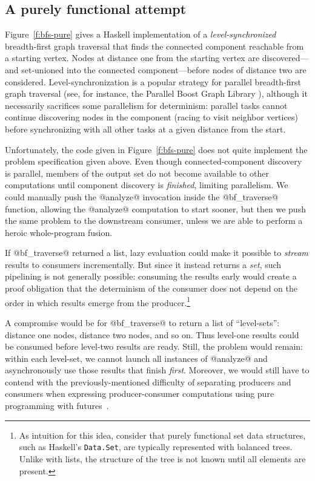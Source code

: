 \subsection{A purely functional attempt}

Figure~\ref{f:bfs-pure} gives a Haskell implementation of a
\emph{level-synchronized} breadth-first graph traversal that finds the
connected component reachable from a starting vertex.  Nodes at
distance one from the starting vertex are discovered---and set-unioned
into the connected component---before nodes of distance two are
considered.  Level-synchronization is a popular strategy for parallel
breadth-first graph traversal (see, for instance, the Parallel Boost
Graph Library \cite{bfs-pbgl}), although it necessarily sacrifices
some parallelism for determinism: parallel tasks cannot continue
discovering nodes in the component (racing to visit neighbor vertices)
before synchronizing with all other tasks at a given distance from the
start.

Unfortunately, the code given in Figure~\ref{f:bfs-pure} does not
quite implement the problem specification given above.  Even though
connected-component discovery is parallel, members of the output set
do not become available to other computations until component
discovery is \emph{finished}, limiting parallelism.  We could manually
push the @analyze@ invocation inside the @bf_traverse@ function,
allowing the @analyze@ computation to start sooner, but then we push
the same problem to the downstream consumer, unless we are able to
perform a heroic whole-program fusion.  

If @bf_traverse@ returned a list, lazy evaluation could make it
possible to \emph{stream} results to consumers incrementally.  But
since it instead returns a \emph{set}, such pipelining is not
generally possible: consuming the results early would create a proof
obligation that the determinism of the consumer does not depend on the
order in which results emerge from the producer.\footnote{As intuition
  for this idea, consider that purely functional set data structures,
  such as Haskell's \lstinline|Data.Set|, are typically represented
  with balanced trees.  Unlike with lists, the structure of the tree
  is not known until all elements are present.}

A compromise would be for @bf_traverse@ to return a list of
``level-sets'': distance one nodes, distance two nodes, and so on.
Thus level-one results could be consumed before level-two results are
ready.  Still, the problem would remain: within each level-set, we
cannot launch all instances of @analyze@ and asynchronously use those
results that finish \emph{first}.  Moreover, we would still have to
contend with the previously-mentioned difficulty of separating
producers and consumers when expressing producer-consumer computations
using pure programming with futures~\cite{monad-par}.

